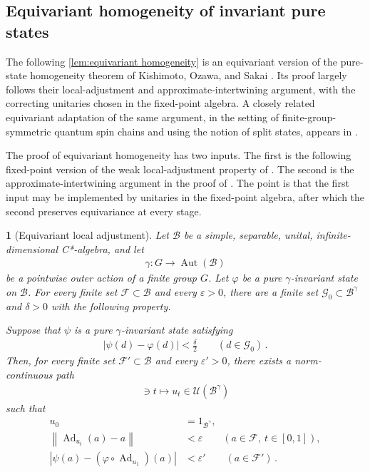 \documentclass[a4paper,10pt]{article}
\numberwithin{equation}{section}
\theoremstyle{plain}
\theoremstyle{plain}
\newtheorem{lem}[lem]{\protect\lemmaname}
\theoremstyle{plain}
\theoremstyle{plain}
\theoremstyle{plain}
\theoremstyle{remark}
\theoremstyle{definition}
\providecommand{\lemmaname}{Lemma}
\newcommand{\calB}{\mathcal{B}}
\newcommand{\calF}{\mathcal{F}}
\newcommand{\calG}{\mathcal{G}}
\newcommand{\calU}{\mathcal{U}}
\newcommand\norm[1]{\left\lVert#1\right\rVert}
\newcommand{\Ad}[1]{\operatorname{Ad}_{#1}}
\newcommand{\eq}[1]{\begin{align*}#1\end{align*}}
\newcommand{\br}[1]{\left(#1\right)}
\begin{document}
\subsection{Equivariant homogeneity of invariant pure states}
The following \cref{lem:equivariant homogeneity} is an equivariant version of the pure-state
 homogeneity theorem of Kishimoto, Ozawa, and Sakai
 \cite{KishimotoOzawaSakai2003Homogeneity}. Its proof largely follows
 their local-adjustment and approximate-intertwining argument, with the
 correcting unitaries chosen in the fixed-point algebra. A closely
 related equivariant adaptation of the same argument, in the setting of
 finite-group-symmetric quantum spin chains and using the notion of
 split states, appears in
 \cite[Section~4]{Ogata2021PureStates}.


The proof of equivariant homogeneity has two inputs. The first is the
following fixed-point version of the weak local-adjustment property of
\cite[Lemma~2.2]{KishimotoOzawaSakai2003Homogeneity}. The second is the
approximate-intertwining argument in the proof of
\cite[Theorem~2.1]{KishimotoOzawaSakai2003Homogeneity}. The point is that
the first input may be implemented by unitaries in the fixed-point
algebra, after which the second preserves equivariance at every stage.

\begin{lem}[Equivariant local adjustment]
\label{lem:equivariant local adjustment}
Let \(\calB\) be a simple, separable, unital, infinite-dimensional
C*-algebra, and let
\eq{
    \gamma:G\longrightarrow\operatorname{Aut}(\calB)
}
be a pointwise outer action of a finite group \(G\). Let \(\varphi\) be
a pure \(\gamma\)-invariant state on \(\calB\). For every finite set
\(\calF\subset\calB\) and every \(\varepsilon>0\), there are a finite
set \(\calG_0\subset\calB^\gamma\) and \(\delta>0\) with the following
property.

Suppose that \(\psi\) is a pure \(\gamma\)-invariant state satisfying
\eq{
    \left|
        \psi(d)-\varphi(d)
    \right|
    <
    \frac{\delta}{2}
    \qquad
    (d\in\calG_0)\,.
}
Then, for every finite set \(\calF'\subset\calB\) and every
\(\varepsilon'>0\), there exists a norm-continuous path
\eq{
    [0,1]\ni t
    \longmapsto
    u_t\in\calU(\calB^\gamma)
}
such that
\eq{
    u_0
    &=
    1_{\calB^\gamma},\\
    \norm{
        \Ad{u_t}(a)-a
    }
    &<
    \varepsilon
    \qquad
    (a\in\calF,\ t\in[0,1]),\\
    \left|
        \psi(a)
        -
        \br{
            \varphi\circ\Ad{u_1}
        }(a)
    \right|
    &<
    \varepsilon'
    \qquad
    (a\in\calF')\,.
}
\end{lem}
\end{document}
